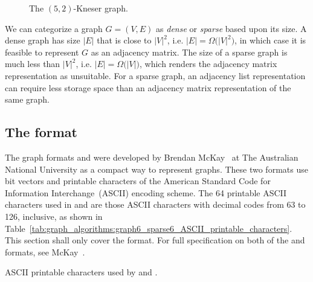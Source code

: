 \begin{figure}[!htbp]
\centering
{}

\caption{The $(5,2)$-Kneser graph.}
\label{fig:graph_algorithms:5_2_Kneser_graph}
\end{figure}

We can categorize a graph $G = (V, E)$ as \emph{dense} or
\emph{sparse} based upon its size. A dense graph
has size $|E|$ that is close to $|V|^2$, i.e.
$|E| = \Omega\big(|V|^2\big)$, in which case it is feasible to
represent $G$ as an adjacency matrix. The size of a sparse
graph is much less than $|V|^2$, i.e.
$|E| = \Omega\big(|V|\big)$, which renders the adjacency
matrix representation as unsuitable. For a
sparse graph, an adjacency list representation
can require less storage space than an adjacency matrix representation
of the same graph.



\subsection{The \graphsix format}
\label{sec:graph_algorithms:graph6_format}

The graph formats \graphsix\index{\graphsix} and
\sparsesix\index{\sparsesix} were developed by Brendan
McKay~\cite{McKay2010} at The Australian
National University as a compact
way to represent graphs. These two formats use bit
vectors and printable characters of the American
Standard Code for Information Interchange~(ASCII)
encoding scheme. The 64 printable ASCII characters used in
\graphsix and \sparsesix are those ASCII characters with decimal codes
from 63 to 126, inclusive, as shown in
Table~\ref{tab:graph_algorithms:graph6_sparse6_ASCII_printable_characters}.
This section shall only cover the \graphsix format. For full
specification on both of the \graphsix and \sparsesix formats, see
McKay~\cite{McKay2010}.

\begin{table}[!htbp]
\centering

\caption{ASCII printable characters used by \graphsix and \sparsesix.}
\label{tab:graph_algorithms:graph6_sparse6_ASCII_printable_characters}
\end{table}


